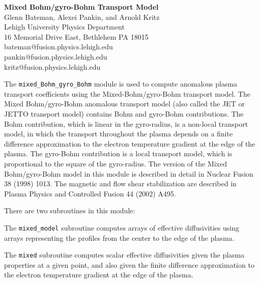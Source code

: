 %
%

\headheight 0pt \headsep 0pt  \topmargin 0pt  \oddsidemargin 0pt
\textheight 9.0in \textwidth 6.5in


\begin{center}
\Large {\bf Mixed Bohm/gyro-Bohm Transport Model} \\
\vspace{1pc} \normalsize
Glenn Bateman, Alexei Pankin, and Arnold Kritz \\
Lehigh University Physics Department \\
16 Memorial Drive East, Bethlehem PA 18015 \\
bateman@fusion.physics.lehigh.edu \\
pankin@fusion.physics.lehigh.edu \\
kritz@fusion.physics.lehigh.edu
\end{center}

The \verb'mixed_Bohm_gyro_Bohm' module is used to compute
anomalous plasma transport coefficients using the Mixed-Bohm/gyro-Bohm
transport model.
The Mixed Bohm/gyro-Bohm anomalous transport model (also called the JET
or JETTO transport model) contains Bohm and gyro-Bohm contributions.
The Bohm contribution, which is linear in the gyro-radius, is a
non-local transport model, in which the transport throughout the plasma
depends on a finite difference approximation to the electron temperature
gradient at the edge of the plasma.  The gyro-Bohm contribution is a
local transport model, which is proportional to the square of the
gyro-radius.  The version of the Mixed Bohm/gyro-Bohm model in this
module is described in detail in Nuclear Fusion 38 (1998) 1013.
The magnetic and flow shear stabilization are described in Plasma
Physics and Controlled Fusion 44 (2002) A495.

There are two subroutines in this module:

The \verb'mixed_model' subroutine computes arrays of effective
diffusivities using arrays representing the profiles from the
center to the edge of the plasma.

The \verb'mixed' subroutine computes scalar effective diffusivities
given the plasma properties at a given point, and also given the
finite difference approximation to the electron temperature gradient
at the edge of the plasma.


